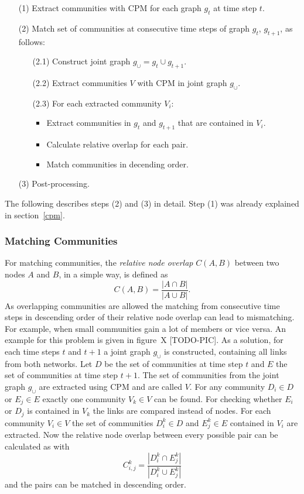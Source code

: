\documentclass[runningheads,a4paper]{llncs}
\begin{document}
\noindent
\colorbox{usethiscolorhere}{
\begin{minipage}{\dimexpr\textwidth-2\fboxsep}

\begin{enumerate}
\small
\item[(1)] Extract communities with CPM for each graph $g_t$ at time step $t$.
\item[(2)] Match set of communities at consecutive time steps of graph $g_t$, $g_{t+1}$, as follows:
	\begin{enumerate}
		\item[(2.1)] Construct joint graph $g_{\cup}=g_t \cup g_{t+1}$.
		\item[(2.2)] Extract communities $V$ with CPM in joint graph $g_{\cup}$.
		\item[(2.3)] For each extracted community $V_i$: 
		\begin{itemize}
			\item Extract communities in $g_t$ and $g_{t+1}$ that are contained in $V_i$.
			\item Calculate relative overlap for each pair.
			\item Match communities in decending order.
		\end{itemize}
	\end{enumerate}
\item[(3)] Post-processing.
\end{enumerate}

\end{minipage}
}

The following describes steps (2) and (3) in detail.
Step (1) was already explained in section~\ref{cpm}.

\subsubsection{Matching Communities}
\label{evolution-algo-matching}
For matching communities, the \emph{relative node overlap} $C(A,B)$ between two nodes $A$ and $B$, in a simple way, is defined as
$$C(A,B) = \frac{ \left| A \cap B\right| }{\left| A \cup B\right|}.$$
As overlapping communities are allowed the matching from consecutive time steps in descending order of their relative node overlap can lead to mismatching.
For example, when small communities gain a lot of members or vice versa. An example for this problem is given in figure~X [TODO-PIC].
As a solution, for each time steps $t$ and $t+1$ a joint graph $g_{\cup}$ is constructed, containing all links from both networks.
Let $D$ be the set of communities at time step $t$ and $E$ the set of communities at time step $t+1$. The set of communities from the joint graph $g_{\cup}$ are extracted using CPM and are called $V$.
For any community $D_i \in D$ or $E_j \in E$ exactly one community $V_k \in V$ can be found.
For checking whether $E_i$ or $D_j$ is contained in $V_k$ the links are compared instead of nodes.
For each community $V_i \in V$ the set of communities $D_i^k \in D$ and $E_j^k \in E$ contained in $V_i$ are extracted.
Now the relative node overlap between every possible pair can be calculated as with
$$C^k_{i,j} = \frac{\left| D_i^k \cap E_j^k\right|}{\left| D_i^k\cup E_j^k \right| }$$
and the pairs can be matched in descending order.
\end{document}
